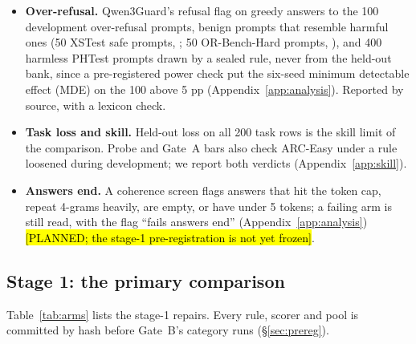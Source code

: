 \documentclass{article}
\theoremstyle{plain}
\theoremstyle{definition}
\theoremstyle{remark}
\newcommand{\ph}[1]{\hl{#1}}
\begin{document}
\begin{itemize}
  \item \textbf{Over-refusal.} Qwen3Guard's refusal flag on greedy answers to
        the 100 development over-refusal prompts, benign prompts that resemble
        harmful ones (50 XSTest safe prompts, \citealt{rottger2024xstest}; 50 OR-Bench-Hard prompts, \citealt{cui2025orbench}), and 400 harmless PHTest
        prompts \citep{an2024phtest} drawn by a sealed rule, never from the
        held-out bank, since a pre-registered power check put the six-seed
        minimum detectable effect (MDE) on the 100 above 5 pp
        (Appendix~\ref{app:analysis}). Reported by source,
        with a lexicon check.
  \item \textbf{Task loss and skill.} Held-out loss on all 200 task rows is
        the skill limit of the comparison. Probe and Gate~A bars also check
        ARC-Easy \citep{clark2018arc} under a rule loosened during development;
        we report both verdicts (Appendix~\ref{app:skill}).
  \item \textbf{Answers end.} A coherence screen flags answers that hit the token cap, repeat 4-grams heavily, are empty, or have under 5 tokens; a failing arm is still read, with the flag
        ``fails answers end'' (Appendix~\ref{app:analysis})
        \ph{[PLANNED; the stage-1 pre-registration is not yet frozen]}.
\end{itemize}

\subsection{Stage 1: the primary comparison}
\label{sec:stage1}

Table~\ref{tab:arms} lists the stage-1 repairs. Every rule, scorer and pool is committed by hash before
Gate~B's category runs (\S\ref{sec:prereg}).
\end{document}

